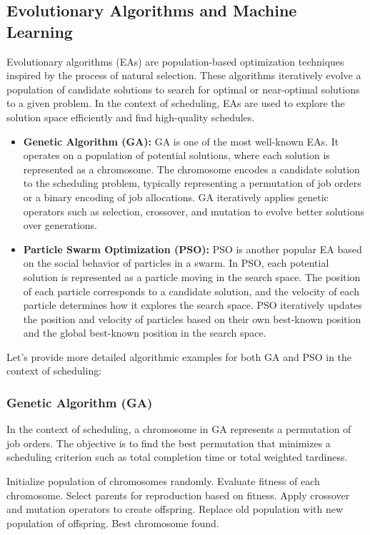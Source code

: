 \documentclass[12pt]{book} %
\begin{document}
\subsection{Evolutionary Algorithms and Machine Learning}

Evolutionary algorithms (EAs) are population-based optimization techniques inspired by the process of natural selection. These algorithms iteratively evolve a population of candidate solutions to search for optimal or near-optimal solutions to a given problem. In the context of scheduling, EAs are used to explore the solution space efficiently and find high-quality schedules.

\begin{itemize}
    \item \textbf{Genetic Algorithm (GA):} GA is one of the most well-known EAs. It operates on a population of potential solutions, where each solution is represented as a chromosome. The chromosome encodes a candidate solution to the scheduling problem, typically representing a permutation of job orders or a binary encoding of job allocations. GA iteratively applies genetic operators such as selection, crossover, and mutation to evolve better solutions over generations.

    \item \textbf{Particle Swarm Optimization (PSO):} PSO is another popular EA based on the social behavior of particles in a swarm. In PSO, each potential solution is represented as a particle moving in the search space. The position of each particle corresponds to a candidate solution, and the velocity of each particle determines how it explores the search space. PSO iteratively updates the position and velocity of particles based on their own best-known position and the global best-known position in the search space.

\end{itemize}

Let's provide more detailed algorithmic examples for both GA and PSO in the context of scheduling:

\subsubsection{Genetic Algorithm (GA)}

In the context of scheduling, a chromosome in GA represents a permutation of job orders. The objective is to find the best permutation that minimizes a scheduling criterion such as total completion time or total weighted tardiness.
\FloatBarrier
\begin{algorithm}
\caption{Genetic Algorithm for Job Scheduling}
\begin{algorithmic}[1]
\State Initialize population of chromosomes randomly.
    \State Evaluate fitness of each chromosome.
    \State Select parents for reproduction based on fitness.
    \State Apply crossover and mutation operators to create offspring.
    \State Replace old population with new population of offspring.
\EndFor
\Return Best chromosome found.
\end{algorithmic}
\end{algorithm}
\end{document}
